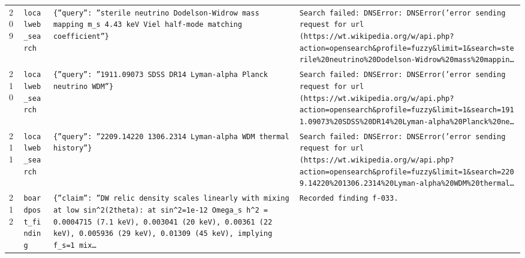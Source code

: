 \documentclass[11pt,a4paper]{article}
\begin{document}
\begin{longtable}{@{}p{}p{}p{}p{}@{}}
209 & \texttt{local}\newline\texttt{web\_\allowbreak{}search} & \texttt{\{''query'':\allowbreak{} ''sterile neutrino Dodelson-Widrow mass mapping m\_\allowbreak{}s 4.43 keV Viel half-mode matching coefficient''\}\allowbreak{}} & \texttt{Search failed:\allowbreak{} DNSError:\allowbreak{} DNSError('error sending request for url (https:\allowbreak{}/\allowbreak{}/\allowbreak{}wt.wikipedia.org/\allowbreak{}w/\allowbreak{}api.php?action=\allowbreak{}opensearch\&profile=\allowbreak{}fuzzy\&limit=\allowbreak{}1\&search=\allowbreak{}sterile\%20neutrino\%20Dodelson-Widrow\%20mass\%20mappin\ldots{}\allowbreak{}} \\
210 & \texttt{local}\newline\texttt{web\_\allowbreak{}search} & \texttt{\{''query'':\allowbreak{} ''1911.09073 SDSS DR14 Lyman-alpha Planck neutrino WDM''\}\allowbreak{}} & \texttt{Search failed:\allowbreak{} DNSError:\allowbreak{} DNSError('error sending request for url (https:\allowbreak{}/\allowbreak{}/\allowbreak{}wt.wikipedia.org/\allowbreak{}w/\allowbreak{}api.php?action=\allowbreak{}opensearch\&profile=\allowbreak{}fuzzy\&limit=\allowbreak{}1\&search=\allowbreak{}1911.09073\%20SDSS\%20DR14\%20Lyman-alpha\%20Planck\%20ne\ldots{}\allowbreak{}} \\
211 & \texttt{local}\newline\texttt{web\_\allowbreak{}search} & \texttt{\{''query'':\allowbreak{} ''2209.14220 1306.2314 Lyman-alpha WDM thermal history''\}\allowbreak{}} & \texttt{Search failed:\allowbreak{} DNSError:\allowbreak{} DNSError('error sending request for url (https:\allowbreak{}/\allowbreak{}/\allowbreak{}wt.wikipedia.org/\allowbreak{}w/\allowbreak{}api.php?action=\allowbreak{}opensearch\&profile=\allowbreak{}fuzzy\&limit=\allowbreak{}1\&search=\allowbreak{}2209.14220\%201306.2314\%20Lyman-alpha\%20WDM\%20thermal\ldots{}\allowbreak{}} \\
212 & \texttt{board}\newline\texttt{post\_\allowbreak{}finding} & \texttt{\{''claim'':\allowbreak{} ''DW relic density scales linearly with mixing at low sin\textasciicircum{}\allowbreak{}2(2theta)\allowbreak{}:\allowbreak{} at sin\textasciicircum{}\allowbreak{}2=\allowbreak{}1e-12 Omega\_\allowbreak{}s h\textasciicircum{}\allowbreak{}2 =\allowbreak{} 0.0004715 (7.1 keV)\allowbreak{},\allowbreak{} 0.003041 (20 keV)\allowbreak{},\allowbreak{} 0.00361 (22 keV)\allowbreak{},\allowbreak{} 0.005936 (29 keV)\allowbreak{},\allowbreak{} 0.01309 (45 keV)\allowbreak{},\allowbreak{} implying f\_\allowbreak{}s=\allowbreak{}1 mix\ldots{}\allowbreak{}} & \texttt{Recorded finding f-033.} \\

\end{longtable}
\end{document}
